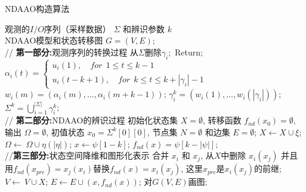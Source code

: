 \renewcommand{\algorithmicrequire}{\textbf{输入:}}
\renewcommand{\algorithmicensure}{\textbf{输出:}}
\begin{algorithm}[h]
  \caption{NDAAO构造算法}
  \label{algo:ndaao}
  \begin{algorithmic}[1]
    \REQUIRE %
    观测的$I/O$序列（采样数据） $\varSigma$ 和辨识参数 $k$ \\  
    
    \ENSURE %
    NDAAO模型和状态转移图 $G=(V,E)$;  \\
    // \textbf{第一部分:}观测序列的转换过程
          \STATE  从$\varSigma$删除$\gamma_i$;\
          \STATE Return;\
        \ELSE
        \STATE $\alpha_i(t)=\begin{cases}
        u_i(1),\quad for ~~ 1\leq t\leq k-1\\
        u_i(t-k+1),\quad for ~~ k \leq t \leq k+|\gamma_i|-1
        \end{cases}$\
        \STATE $w_i(m)=(\alpha_i(m),...,\alpha_i(m+k-1))$;
        \ENDFOR
        \STATE $\gamma_i^k=(w_i(1),...,w_i(|\gamma_i|))$;
        \ENDIF
    \ENDFOR
    \STATE $\varSigma^k=\bigcup\limits_{i=1}^{|\varSigma|}  \gamma_i^k$;\\
    // \textbf{第二部分:}NDAAO的辨识过程​​
    \STATE 初始化状态集 $X=\emptyset$, 转移函数 $f_{nd}(x_0)=\emptyset$, 输出 $\Omega=\emptyset$, 初值状态 $x_0=\varSigma^k[0][0]$, 节点集 $N=\emptyset$ 和边集 $E=\emptyset$;
    \FORALL {$\xi$ such that $\xi \in \varSigma^k$} 
      \STATE $X\leftarrow X\cup \xi$; 
      \STATE $\Omega \leftarrow\ \Omega \cup \eta(|\eta|)$;
      \ENDFOR
    \ENDFOR
      \STATE $x \leftarrow \psi[1-k]$;
      \STATE $f_{nd}(x)=\psi[k-|\psi|]$;  
      \ENDFOR
    \ENDFOR\\
    //\textbf{第三部分:}状态空间降维和图形化表示
        \STATE 合并 $x_i$ 和 $x_j$, 从$X$中删除 $x_i(x_j)$ 并且用$f_{nd}(x_{pre})=x_j(x_i)$替换$f_{nd}(x)=x_i(x_j)$, 这里$x_{pre}$是$x_i(x_j)$的前继;  
      \ENDIF
    \ENDFOR
    \STATE $V\leftarrow\ V\cup X$; 
    \STATE $E \leftarrow E\cup (x,f_{nd}(x))$;
    \STATE 对$G(V,E)$画图;
  \end{algorithmic}
\end{algorithm}

